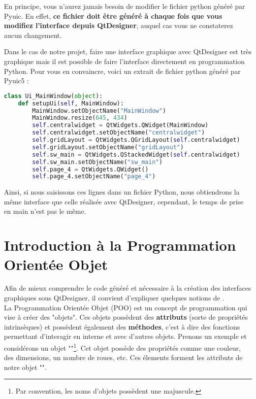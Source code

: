 En  principe,  vous  n’aurez  jamais  besoin  de  modifier  le  fichier  python généré par Pyuic. En  effet, \textbf{{\color{red}ce  fichier  doit être généré à chaque  fois  que  vous  modifiez l’interface depuis QtDesigner}}, auquel cas vous ne constaterez aucun changement. \newline

Dans le cas de notre projet, faire une interface graphique avec QtDesigner est très graphique mais il est possible de faire l'interface directement en programmation Python. \newline
Pour vous en convaincre, voici un extrait de fichier python généré par Pyuic5 : \newline

\begin{lstlisting}[language=python]
class Ui_MainWindow(object):
    def setupUi(self, MainWindow):
        MainWindow.setObjectName("MainWindow")
        MainWindow.resize(645, 434)
        self.centralwidget = QtWidgets.QWidget(MainWindow)
        self.centralwidget.setObjectName("centralwidget")
        self.gridLayout = QtWidgets.QGridLayout(self.centralwidget)
        self.gridLayout.setObjectName("gridLayout")
        self.sw_main = QtWidgets.QStackedWidget(self.centralwidget)
        self.sw_main.setObjectName("sw_main")
        self.page_4 = QtWidgets.QWidget()
        self.page_4.setObjectName("page_4")
\end{lstlisting}
Ainsi, si nous saisissons ces lignes dans un fichier Python, nous obtiendrons la même interface que celle réalisée avec QtDesigner, cependant, le temps de prise en main n'est pas le même. \newline

\section{Introduction à la Programmation Orientée Objet}
Afin de mieux comprendre le code généré et nécessaire à la création des interfaces graphiques sous QtDesigner, il convient d'expliquer quelques notions de . \\

La Programmation Orientée Objet (POO) est un concept de programmation qui vise à créer des "objets". \newline \newline
Ces objets possèdent des \textbf{attributs} (sorte de propriétés intrinsèques) et possèdent également des \textbf{méthodes}, c'est à dire des fonctions permettant d'interagir en interne et avec d'autres objets. \newline \newline
Prenons un exemple et considérons un objet ""\footnote{Par convention, les noms d'objets possèdent une majuscule.}. \newline
Cet objet possède des propriétés comme une couleur, des dimensions, un nombre de roues, etc. Ces élements forment les attributs de notre objet "". \newline


